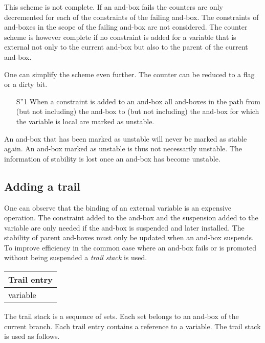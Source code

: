 This scheme is not complete. If an and-box fails the counters are only
decremented for each of the constraints of the failing and-box. The
constraints of and-boxes in the scope of the failing and-box are not
considered. The counter scheme is however complete if no constraint is
added for a variable that is external not only to the current and-box
but also to the parent of the current and-box.

One can simplify the scheme even further. The counter can be reduced
to a flag or a dirty bit.

\begin{itemize}

\item[S''1] When a constraint is added to an and-box all and-boxes in the 
path from (but not including) the and-box to (but not including) the and-box
for which the variable is local are marked as unstable.

\end{itemize}

An and-box that has been marked as unstable will never be marked as
stable again.  An and-box marked as unstable is thus not necessarily unstable.
The information of stability is lost once an and-box has become unstable. 


\subsection*{Adding a trail}

One can observe that the binding of an external variable is an
expensive operation. The constraint added to the and-box and the
suspension added to the variable are only needed if the and-box is
suspended and later installed. The stability of parent and-boxes must
only be updated when an and-box suspends. To improve efficiency in the
common case where an and-box fails or is promoted without being
suspended a {\em trail stack} is used.

\begin{center} \begin{tabular}{|l|}\hline
Trail entry \\
\hline
\hline
variable \\
\hline
\end{tabular} \end{center}

The trail stack is a sequence of sets. Each set belongs to an and-box
of the current branch. Each trail entry contains a reference to a
variable. The trail stack is used as follows.


